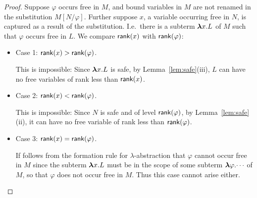\documentclass{article}
\newcommand\blambda{\hbox{\boldmath $\lambda$}}
\newcommand\lterm[2]{{\blambda{#1}.{#2}}}
\theoremstyle{definition}
\theoremstyle{remark}
\newcommand\rank[1]{{\sf rank}(#1)}
\begin{document}
\begin{proof} Suppose $\varphi$ occurs free in $M$, and
bound variables in $M$ are not renamed in the substitution $M[N /
\varphi]$. Further suppose $x$, a variable occurring free in $N$, is
captured as a result of the substitution. I.e.~there is a subterm
$\lterm{x}{L}$ of $M$ such that $\varphi$ occurs free in $L$. We
compare $\rank{x}$ with $\rank{\varphi}$:

\begin{itemize}
\item {Case 1}: $\rank{x} > \rank{\varphi}$.

This is impossible: Since $\lterm{x}{L}$ is safe, by
Lemma~\ref{lem:safe}(iii), $L$ can have no free variables of rank
less than $\rank{x}$.

\item {Case 2}: $\rank{x} < \rank{\varphi}$.

This is impossible: Since $N$ is safe and of level $\rank{\varphi}$,
by Lemma~\ref{lem:safe}(ii), it can have no free variable of rank
less than $\rank{\varphi}$.

\item {Case 3}: $\rank{x} = \rank{\varphi}$.

If follows from the formation rule for $\lambda$-abstraction that
$\varphi$ cannot occur free in $M$ since the subterm $\lterm{x}{L}$
must be in the scope of some subterm $\lterm{\varphi}{\cdots}$ of
$M$, so that $\varphi$ does not occur free in $M$. Thus this case
cannot arise either.
\end{itemize}

\end{proof}



\end{document}

